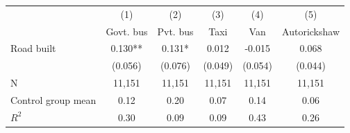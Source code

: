 {
\def\sym#1{\ifmmode^{#1}\else\(^{#1}\)\fi}
\begin{tabular}{l*{5}{c}}
\hline\hline
                         &\multicolumn{1}{c}{(1)}&\multicolumn{1}{c}{(2)}&\multicolumn{1}{c}{(3)}&\multicolumn{1}{c}{(4)}&\multicolumn{1}{c}{(5)}\\
                         &\multicolumn{1}{c}{Govt. bus}&\multicolumn{1}{c}{Pvt. bus}&\multicolumn{1}{c}{Taxi}&\multicolumn{1}{c}{Van}&\multicolumn{1}{c}{Autorickshaw}\\
\hline
Road built               &       0.130** &       0.131*  &       0.012   &      -0.015   &       0.068   \\
                         &     (0.056)   &     (0.076)   &     (0.049)   &     (0.054)   &     (0.044)   \\
\hline
N                        &      11,151   &      11,151   &      11,151   &      11,151   &      11,151   \\
Control group mean       &        0.12   &        0.20   &        0.07   &        0.14   &        0.06   \\
$ R^{2} $                &        0.30   &        0.09   &        0.09   &        0.43   &        0.26   \\
\hline\hline
\end{tabular}
}
